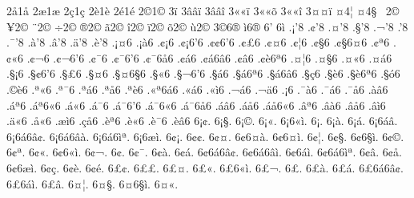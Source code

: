 {2^^e51^^e5 2^^e61^^e6 2^^e71^^e7 2^^e81^^e8 2^^e91^^e9 2^^a91^^a9 
3^^ad^^ad^^ef 3^^e2^^e2^^ef 3^^e2^^e2^^ee 3^^ab^^ab^^ef 3^^ab^^ab^^f5 3^^ab^^ab^^ee 3^^a4^^a4^^ef 
^^a44^^a6 ^^a44^^a7 
^^a02^^a9 ^^a52^^a9 ^^a82^^a9 ^^f72^^a9 ^^ae2^^a9 ^^e32^^a9 ^^ee2^^a9 ^^ef2^^a9 ^^f52^^a9 ^^f92^^a9 3^^a96^^ae 
^^ec6^^ae 6' 6^^ec 
.^^a1'8 .^^a2'8 .^^a4'8 .^^a7'8 .^^ac'8 .^^ad'8 .^^af'8 .^^e0'8 
.^^e2'8 .^^e4'8 .^^e8'8 .^^a1^^a46 .^^a1^^e06 .^^a2^^a16 .^^a2^^a16'6 .^^a2^^a26'6 
.^^a2^^a36 .^^a2^^a46 .^^a2^^a66 .^^a2^^a76 .^^a2^^a76^^a46 .^^a2^^aa6 .^^a2^^ab6 .^^a2^^ac6 
.^^a2^^ac6'6 .^^a2^^af6 .^^a2^^af6'6 .^^a2^^af6^^e56 .^^a2^^e16 .^^a2^^e16^^e26 .^^a2^^e26 .^^a2^^e86^^aa6 
.^^a4^^a66 .^^a4^^a76 .^^a4^^ab6 .^^a4^^e16 .^^a7^^a16 .^^a7^^a26'6 .^^a7^^a36 .^^a7^^a46 
.^^a7^^a46^^a76 .^^a7^^ab6 .^^a7^^ac6'6 .^^a7^^e16 .^^a7^^e16^^aa6 .^^a7^^e16^^e26 .^^a7^^e76 .^^a7^^e86 
.^^a7^^e86^^aa6 .^^a7^^f36 .^^a9^^e86 .^^aa^^ab6 .^^aa^^af6 .^^aa^^e16 .^^aa^^e56 .^^aa^^e86 
.^^ab^^aa6^^e16 .^^ab^^e16 .^^ab^^ec6 .^^ac^^e16 .^^ac^^e46 .^^ad^^a16 .^^af^^e06 .^^af^^e16 
.^^af^^e56 .^^e0^^e26 .^^e1^^aa6 .^^e1^^aa6^^ab6 .^^e1^^ab6 .^^e1^^af6 .^^e1^^af6'6 .^^e1^^af6^^ab6 
.^^e1^^af6^^e56 .^^e1^^e26 .^^e1^^e56 .^^e1^^e56^^ab6 .^^e2^^aa6 .^^e2^^e06 .^^e2^^e56 .^^e2^^ec6 
.^^e4^^ab6 .^^e5^^ab6 .^^e6^^ec6 .^^e7^^e56 .^^e8^^aa6 .^^e8^^ab6 .^^e8^^af6 .^^e8^^e26 
6^^a1^^a2. 6^^a1^^a7. 6^^a1^^a9. 6^^a1^^ab. 6^^a16^^ab^^ec. 6^^a1^^ad. 6^^a1^^e0. 6^^a1^^e1. 
6^^a16^^e1^^e2. 6^^a16^^e16^^e2^^a2. 6^^a16^^e16^^e2^^e0. 6^^a16^^e16^^ec^^aa. 6^^a16^^e6^^ec. 6^^a2^^a1. 6^^a2^^a2. 6^^a2^^a4. 
6^^a26^^a4^^e0. 6^^a26^^a4^^ec. 6^^a2^^a6. 6^^a2^^a7. 6^^a26^^a7^^ec. 6^^a2^^a9. 6^^a2^^aa. 6^^a2^^ab. 
6^^a26^^ab^^ec. 6^^a2^^ac. 6^^a2^^ad. 6^^a2^^af. 6^^a2^^e0. 6^^a2^^e1. 6^^a26^^e16^^e2^^a2. 6^^a26^^e16^^e2^^ec. 
6^^a26^^e1^^ec. 6^^a26^^e16^^ec^^aa. 6^^a2^^e2. 6^^a2^^e5. 6^^a26^^e6^^ec. 6^^a2^^e7. 6^^a2^^e8. 6^^a2^^e9. 
6^^a3^^a2. 6^^a3^^a3. 6^^a3^^a4. 6^^a3^^ab. 6^^a36^^ab^^ec. 6^^a3^^ac. 6^^a3^^ad. 6^^a3^^e0. 
6^^a3^^e1. 6^^a36^^e16^^e2^^a2. 6^^a36^^e1^^ec. 6^^a3^^e2. 6^^a4^^a6. 6^^a4^^a7. 6^^a46^^a7^^ec. 6^^a4^^ab. 
}

